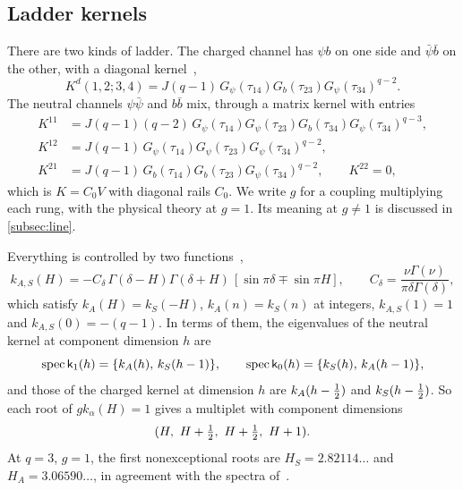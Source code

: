\subsection{Ladder kernels}

There are two kinds of ladder. The charged channel has $\psi b$ on one side and $\bar\psi\bar b$ on the other, with a diagonal kernel~\cite[(2.12)]{Peng:2017spg},
\begin{equation}\label{eq:Kd}
K^d(1,2;3,4)=J(q-1)\,G_\psi(\tau_{14})G_b(\tau_{23})G_\psi(\tau_{34})^{q-2}.
\end{equation}
The neutral channels $\psi\bar\psi$ and $b\bar b$ mix, through a matrix kernel with entries~\cite[(2.22)--(2.24)]{Peng:2017spg}
\begin{equation}\label{eq:Kmatrix}
\begin{aligned}
K^{11}&=J(q-1)(q-2)\,G_\psi(\tau_{14})G_\psi(\tau_{23})G_b(\tau_{34})G_\psi(\tau_{34})^{q-3},\\
K^{12}&=J(q-1)\,G_\psi(\tau_{14})G_\psi(\tau_{23})G_\psi(\tau_{34})^{q-2},\\
K^{21}&=J(q-1)\,G_b(\tau_{14})G_b(\tau_{23})G_\psi(\tau_{34})^{q-2},\qquad K^{22}=0,
\end{aligned}
\end{equation}
which is $K=C_0V$ with diagonal rails $C_0$. We write $g$ for a coupling multiplying each rung, with the physical theory at $g=1$. Its meaning at $g\neq1$ is discussed in \cref{subsec:line}.

Everything is controlled by two functions~\cite{Peng:2017spg,Bulycheva:2018qcp},
\begin{equation}\label{eq:kAkS}
k_{A,S}(H)=-C_\delta\,\Gamma(\delta-H)\Gamma(\delta+H)\,[\sin\pi\delta\mp\sin\pi H],\qquad C_\delta=\frac{\nu\Gamma(\nu)}{\pi\delta\Gamma(\delta)},
\end{equation}
which satisfy $k_A(H)=k_S(-H)$, $k_A(n)=k_S(n)$ at integers, $k_{A,S}(1)=1$ and $k_{A,S}(0)=-(q-1)$. In terms of them, the eigenvalues of the neutral kernel at component dimension $h$ are
\begin{equation}\label{eq:spectra}
\operatorname{spec}\mathsf{k}_1(h)=\{k_A(h),\,k_S(h-1)\},\qquad\operatorname{spec}\mathsf{k}_0(h)=\{k_S(h),\,k_A(h-1)\},
\end{equation}
and those of the charged kernel at dimension $h$ are $k_A(h-\tfrac12)$ and $k_S(h-\tfrac12)$. So each root of $gk_\alpha(H)=1$ gives a multiplet with component dimensions
\begin{equation}\label{eq:multiplet}
(H,\ H+\tfrac12,\ H+\tfrac12,\ H+1).
\end{equation}
At $q=3$, $g=1$, the first nonexceptional roots are $H_S=2.82114\ldots$ and $H_A=3.06590\ldots$, in agreement with the spectra of~\cite{Fu:2016vas,Peng:2017spg}.

